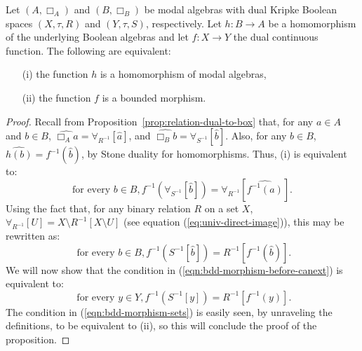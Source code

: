 \begin{proposition}\label{prop:bounded-morphisms}
  Let $(A, \Box_A)$ and $(B, \Box_B)$ be modal algebras with dual Kripke Boolean spaces $(X, \tau, R)$ and $(Y, \tau, S)$, respectively. Let $h \colon B \to A$ be a homomorphism of the underlying Boolean algebras and let $f \colon X \to Y$ the dual continuous function. The following are equivalent:
  \begin{enumerate}
    \item[(i)] the function $h$ is a homomorphism of modal algebras,
    \item[(ii)] the function $f$ is a bounded morphism. 
  \end{enumerate}
\end{proposition}
\begin{proof}
Recall from Proposition~\ref{prop:relation-dual-to-box} that, for any $a \in A$ and $b \in B$,
$\widehat{\Box_A a} = \forall_{R^{-1}}[\widehat{a}]$, and
$\widehat{\Box_B b} = \forall_{S^{-1}}[\widehat{b}]$. 
Also, for any $b \in B$, $\widehat{h(b)} = f^{-1}(\widehat{b})$, by Stone duality for homomorphisms.
Thus, (i) is equivalent to: 
\begin{equation}\label{eqn:modal-alg-hom-dually}
\text{for every } b \in B, f^{-1}(\forall_{S^{-1}}[\widehat{b}]) = \forall_{R^{-1}}[\widehat{f^{-1}(a)}].
\end{equation}
Using the fact that, for any binary relation $R$ on a set $X$, 
$\forall_{R^{-1}}[U] = X \setminus R^{-1}[X \setminus U]$
(see equation (\ref{eq:univ-direct-image})),
this may be rewritten as:
\begin{equation}\label{eqn:bdd-morphism-before-canext}
\text{ for every } b \in B, f^{-1}(S^{-1}[\widehat{b}]) = R^{-1}[f^{-1}(\widehat{b})].
\end{equation}
We will now show that the condition in (\ref{eqn:bdd-morphism-before-canext}) is equivalent to:
\begin{equation}\label{eqn:bdd-morphism-sets}
\text{ for every } y \in Y, f^{-1}(S^{-1}[y]) = R^{-1}[f^{-1}(y)].
\end{equation}
The condition in (\ref{eqn:bdd-morphism-sets}) is easily seen, by unraveling the definitions, to be equivalent to (ii), so this will conclude the proof of the proposition.


\end{proof}
